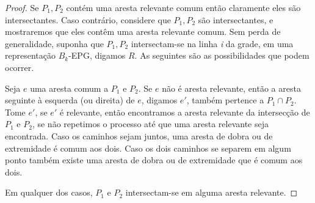 \begin{proof}
Se $P_1, P_2$ contém uma aresta relevante comum então claramente eles são intersectantes. Caso contrário, considere que $P_1, P_2$ são intersectantes, e mostraremos que eles contêm uma aresta relevante comum. Sem perda de generalidade, suponha que $P_1, P_2$ intersectam-se na linha \textit{i} da grade, em uma representação   $B_k$-EPG, digamos $R$. As seguintes são as possibilidades que podem ocorrer. 

Seja $e$ uma aresta comum a $P_1$ e $P_2$. Se $e$ não é aresta relevante, então a aresta seguinte à  esquerda (ou direita) de $e$, digamos $e'$, também pertence a $P_1 \cap P_2$. Tome $e'$, se $e'$ é relevante, então encontramos a aresta relevante da intersecção de $P_1$ e $P_2$, se não repetimos o processo até que uma aresta relevante seja encontrada. Caso os caminhos sejam juntos, uma aresta de dobra ou de extremidade é comum aos dois. Caso os dois caminhos se separem em algum ponto também existe uma aresta de dobra ou de extremidade que é comum aos dois.






 
Em qualquer dos casos, $P_1$ e $P_2$ intersectam-se em alguma aresta relevante.
\end{proof}

